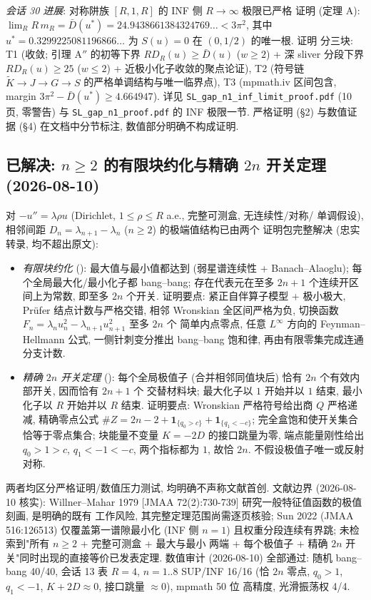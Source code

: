 \documentclass[UTF8]{ctexart}
\begin{document}
\emph{会话 30 进展}: 对称阱族 $[R,1,R]$ 的 INF 侧 $R\to\infty$ 极限已严格
证明 (定理 A): $\lim_R R\,m_R=\bar D(u^*)=24.9438661384324769\ldots<3\pi^2$,
其中 $u^*=0.3299225081196866\ldots$ 为 $S(u)=0$ 在 $(0,1/2)$ 的唯一根. 证明
分三块: T1 (收敛; 引理 A$''$ 的初等下界 $R D_R(u)\ge\bar D(u)$ ($w\ge2$) +
深 sliver 分段下界 $R D_R(u)\ge25$ ($w\le2$) + 近极小化子收敛的聚点论证),
T2 (符号链 $\widetilde K\to J\to G\to S$ 的严格单调结构与唯一临界点),
T3 (mpmath.iv 区间包含, margin $3\pi^2-\bar D(u^*)\ge4.664947$). 详见
\texttt{SL\_gap\_n1\_inf\_limit\_proof.pdf} (10 页, 零警告) 与
\texttt{SL\_gap\_n1\_proof.pdf} 的 INF 极限一节. 严格证明 (§2) 与数值证据
(§4) 在文档中分节标注, 数值部分明确不构成证明.

\subsection{已解决: \texorpdfstring{$n\ge2$}{n>=2} 的有限块约化与精确 \texorpdfstring{$2n$}{2n} 开关定理 (2026-08-10)}

对 $-u''=\lambda\rho u$ (Dirichlet, $1\le\rho\le R$ a.e., 完整可测盒, 无连续性/对称/
单调假设), 相邻间距 $D_n=\lambda_{n+1}-\lambda_n$ ($n\ge2$) 的极端值结构已由两个
证明包完整解决 (忠实转录, 均不超出原文):

\begin{itemize}
\item \emph{有限块约化} ():
最大值与最小值都达到 (弱星谱连续性 + Banach--Alaoglu); 每个全局最大化/最小化子都
bang--bang; 存在代表元在至多 $2n+1$ 个连续开区间上为常数, 即至多 $2n$ 个开关.
证明要点: 紧正自伴算子模型 + 极小极大, Pr\"ufer 结点计数与严格交错, 相邻 Wronskian
全区间严格为负, 切换函数 $F_n=\lambda_n u_n^2-\lambda_{n+1}u_{n+1}^2$ 至多 $2n$ 个
简单内点零点, 任意 $L^\infty$ 方向的 Feynman--Hellmann 公式, 一侧针刺变分推出
bang--bang 饱和律, 再由有限零集完成连通分支计数.
\item \emph{精确 $2n$ 开关定理} ():
每个全局极值子 (合并相邻同值块后) 恰有 $2n$ 个有效内部开关, 因而恰有 $2n+1$ 个
交替材料块; 最大化子以 $1$ 开始并以 $1$ 结束, 最小化子以 $R$ 开始并以 $R$ 结束.
证明要点: Wronskian 严格符号给出商 $Q$ 严格递减, 精确零点公式
$\#Z=2n-2+\mathbf 1_{\{q_0>c\}}+\mathbf 1_{\{q_1<-c\}}$; 完全盒饱和使开关集合
恰等于零点集合; 块能量不变量 $K=-2D$ 的接口跳量为零, 端点能量刚性给出 $q_0>1>c$,
$q_1<-1<-c$, 两个指标都为 $1$, 故恰 $2n$. 不假设极值子唯一或反射对称.
\end{itemize}

两者均区分严格证明/数值压力测试, 均明确不声称文献首创. 文献边界 (2026-08-10 核实):
Willner--Mahar 1979 [JMAA 72(2):730-739] 研究一般特征值函数的极值刻画, 是明确的既有
工作风险, 其完整定理范围尚需逐页核验; Sun 2022 (JMAA 516:126513) 仅覆盖第一谱隙最小化
(INF 侧 $n=1$) 且权重分段连续有界跳; 未检索到"所有 $n\ge2$ + 完整可测盒 + 最大与最小
两端 + 每个极值子 + 精确 $2n$ 开关"同时出现的直接等价已发表定理. 数值审计 (2026-08-10)
全部通过: 随机 bang--bang 40/40, 会话 13 表 $R=4$, $n=1..8$ SUP/INF 16/16
(恰 $2n$ 零点, $q_0>1$, $q_1<-1$, $K+2D\approx0$, 接口跳量 $\approx0$), mpmath 50 位
高精度, 光滑振荡权 4/4.
\end{document}
